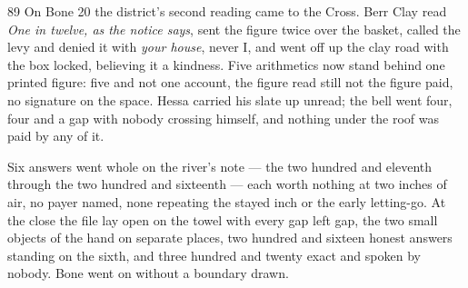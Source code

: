 \begin{CRchronicle}{89}
On Bone 20 the district’s second reading came to the Cross. Berr Clay read \emph{One in twelve, as the notice says}, sent the figure twice over the basket, called the levy and denied it with \emph{your house}, never I, and went off up the clay road with the box locked, believing it a kindness. Five arithmetics now stand behind one printed figure: five and not one account, the figure read still not the figure paid, no signature on the space. Hessa carried his slate up unread; the bell went four, four and a gap with nobody crossing himself, and nothing under the roof was paid by any of it.

Six answers went whole on the river’s note --- the two hundred and eleventh through the two hundred and sixteenth --- each worth nothing at two inches of air, no payer named, none repeating the stayed inch or the early letting-go. At the close the file lay open on the towel with every gap left gap, the two small objects of the hand on separate places, two hundred and sixteen honest answers standing on the sixth, and three hundred and twenty exact and spoken by nobody. Bone went on without a boundary drawn.
\end{CRchronicle}
